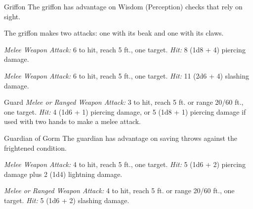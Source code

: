 \documentclass[10pt,a4paper,twoside,bg=print,twocolumn,openany,nodeprecatedcode]{dndbook}
\begin{document}
\clearpage

\begin{DndMonster}[float=t]{Griffon}
\DndMonsterBasics[
armor-class = {12},
hit-points = {\DndDice{7d10 + 21}},
speed = {30 ft., fly 80 ft.}
]
\DndMonsterAbilityScores[
 str = 18,
 dex = 15,
 con = 16,
 int = 2,
 wis = 13,
 cha = 8
]
\DndMonsterDetails[
skills = {Perception +5},
senses = {darkvision 60 ft., passive perception 15},
challenge = 2,
]
The griffon has advantage on Wisdom (Perception) checks that rely on sight.

The griffon makes two attacks: one with its beak and one with its claws.

\textsl{Melee Weapon Attack:} 6 to hit, reach 5 ft., one target. \textsl{Hit:} 8 (1d8 + 4) piercing damage.

\textsl{Melee Weapon Attack:} 6 to hit, reach 5 ft., one target. \textsl{Hit:} 11 (2d6 + 4) slashing damage.

\end{DndMonster}



\begin{DndMonster}[float=t]{Guard}
\DndMonsterBasics[
armor-class = {16 (\textit{chain shirt})},
hit-points = {\DndDice{2d8 + 2}},
speed = {30 ft.}
]
\DndMonsterAbilityScores[
 str = 13,
 dex = 12,
 con = 12,
 int = 10,
 wis = 11,
 cha = 10
]
\DndMonsterDetails[
skills = {Perception +2},
languages = {any one language (usually Common)},
challenge = 1/8,
]
\textsl{Melee or Ranged Weapon Attack:} 3 to hit, reach 5 ft. or range 20/60 ft., one target. \textsl{Hit:} 4 (1d6 + 1) piercing damage, or 5 (1d8 + 1) piercing damage if used with two hands to make a melee attack.

\end{DndMonster}



\begin{DndMonster}[float=t]{Guardian of Gorm}
\DndMonsterBasics[
armor-class = {16 (\textit{chain mail})},
hit-points = {\DndDice{2d8}},
speed = {30 ft.}
]
\DndMonsterAbilityScores[
 str = 15,
 dex = 10,
 con = 10,
 int = 10,
 wis = 13,
 cha = 12
]
\DndMonsterDetails[
skills = {Athletics +4, Insight +3, Religion +2},
languages = {Common},
challenge = 1/8,
]
The guardian has advantage on saving throws against the frightened condition.

\textsl{Melee Weapon Attack:} 4 to hit, reach 5 ft., one target. \textsl{Hit:} 5 (1d6 + 2) piercing damage plus 2 (1d4) lightning damage.

\textsl{Melee or Ranged Weapon Attack:} 4 to hit, reach 5 ft. or range 20/60 ft., one target. \textsl{Hit:} 5 (1d6 + 2) slashing damage.

\end{DndMonster}
\end{document}
